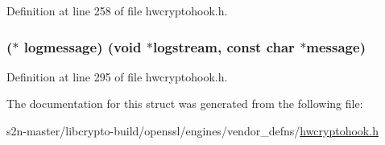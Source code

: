 Definition at line 258 of file hwcryptohook.\+h.

\subsubsection[{\texorpdfstring{logmessage}{logmessage}}]{($\ast$ logmessage) ({\bf void} $\ast${\bf logstream}, const char $\ast$message)}\hypertarget{struct_h_w_crypto_hook___init_info_a7f61a41fe4edc7b9c63392a1bdd2cd4b}{}\label{struct_h_w_crypto_hook___init_info_a7f61a41fe4edc7b9c63392a1bdd2cd4b}


Definition at line 295 of file hwcryptohook.\+h.



The documentation for this struct was generated from the following file\+:\begin{DoxyCompactItemize}
\item 
s2n-\/master/libcrypto-\/build/openssl/engines/vendor\+\_\+defns/\hyperlink{hwcryptohook_8h}{hwcryptohook.\+h}\end{DoxyCompactItemize}
